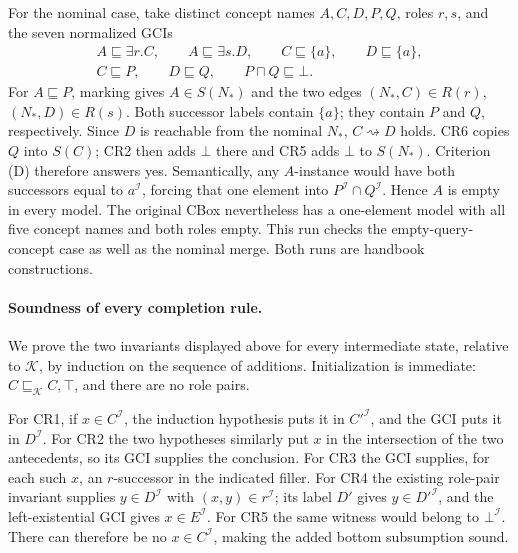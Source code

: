 For the nominal case, take distinct concept names \(A,C,D,P,Q\), roles
\(r,s\), and the seven normalized GCIs
\[
\begin{gathered}
 A\sqsubseteq\exists r.C,\qquad A\sqsubseteq\exists s.D,\qquad
 C\sqsubseteq\{a\},\qquad D\sqsubseteq\{a\},\\
 C\sqsubseteq P,\qquad D\sqsubseteq Q,\qquad P\sqcap Q\sqsubseteq\bot.
\end{gathered}
\]
For \(A\sqsubseteq P\), marking gives \(A\in S(N_\ast)\) and the two
edges \((N_\ast,C)\in R(r)\), \((N_\ast,D)\in R(s)\).
Both successor labels contain \(\{a\}\); they contain \(P\) and \(Q\),
respectively.  Since \(D\) is reachable from the nominal \(N_\ast\),
\(C\rightsquigarrow D\) holds.  CR6 copies \(Q\) into \(S(C)\);
CR2 then adds \(\bot\) there and CR5 adds \(\bot\) to \(S(N_\ast)\).
Criterion (D) therefore answers yes.  Semantically, any \(A\)-instance would
have both successors equal to \(a^{\mathcal I}\), forcing that one element
into \(P^{\mathcal I}\cap Q^{\mathcal I}\).  Hence \(A\) is empty in every
model.  The original CBox nevertheless has a one-element model with all five
concept names and both roles empty.  This run checks the empty-query-concept
case as well as the nominal merge.  Both runs are handbook constructions.

\paragraph{Soundness of every completion rule.}
We prove the two invariants displayed above for every intermediate state,
relative to \(\mathcal K\), by induction on the sequence of additions.
Initialization is immediate: \(C\sqsubseteq_{\mathcal K}C,\top\), and
there are no role pairs.

For CR1, if \(x\in C^{\mathcal I}\), the induction hypothesis puts it in
\(C'^{\mathcal I}\), and the GCI puts it in \(D^{\mathcal I}\).
For CR2 the two hypotheses similarly put \(x\) in the intersection of
the two antecedents, so its GCI supplies the conclusion.
For CR3 the GCI supplies, for each such \(x\), an \(r\)-successor in
the indicated filler.  For CR4 the existing role-pair invariant supplies
\(y\in D^{\mathcal I}\) with \((x,y)\in r^{\mathcal I}\); its label
\(D'\) gives \(y\in D'^{\mathcal I}\), and the left-existential GCI
gives \(x\in E^{\mathcal I}\).
For CR5 the same witness would belong to \(\bot^{\mathcal I}\).
There can therefore be no \(x\in C^{\mathcal I}\), making the added
bottom subsumption sound.

